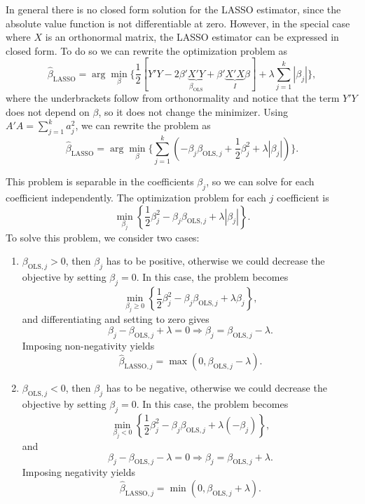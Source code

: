 \documentclass[11pt]{article}
\begin{document}
In general there is no closed form solution for the LASSO estimator, since the absolute value function is not differentiable at zero. However, in the special case where $X$ is an orthonormal matrix, the LASSO estimator can be expressed in closed form.
To do so we can rewrite the optimization problem as
\[
\hat{\beta}_{\text{LASSO}} 
= \arg\min_{\beta} 
\Big\{ \frac{1}{2}\left[Y'Y - 2\beta'\underbrace{X'Y}_{\beta_{\text{OLS}}} 
+ \beta'\underbrace{X'X}_{I}\beta\right]
+ \lambda \sum_{j=1}^{k} |\beta_j| \Big\},
\]
where the underbrackets follow from orthonormality and notice that the term $Y'Y$ does not depend on $\beta$, so it does not change the minimizer.
Using $A'A = \sum_{j=1}^{k} a_j^2$, we can rewrite the problem as
\[
\hat{\beta}_{\text{LASSO}} = \arg\min_{\beta} \Big\{ \sum_{j=1}^{k} \left( -\beta_j \beta_{\text{OLS},j} + \frac{1}{2}\beta_j^2 + \lambda |\beta_j| \right) \Big\}.
\]

This problem is separable in the coefficients $\beta_j$, so we can solve for each coefficient independently. The optimization problem for each $j$ coefficient is
\[\min_{\beta_j} \left\{\frac{1}{2} \beta_j^2 - \beta_j \beta_{\text{OLS},j} + \lambda |\beta_j| \right\}.\]
To solve this problem, we consider two cases:
\begin{enumerate}
    \item $\beta_{\text{OLS},j} > 0$, then $\beta_j$ has to be positive, otherwise we could decrease the objective by setting $\beta_j = 0$. 
    In this case, the problem becomes 
    \[\min_{\beta_j \geq 0} \left\{ \frac{1}{2} \beta_j^2 - \beta_j \beta_{\text{OLS},j} + \lambda \beta_j \right\},\]
    and differentiating and setting to zero gives
    \[\beta_j - \beta_{\text{OLS},j} + \lambda = 0 \Rightarrow \beta_j = \beta_{\text{OLS},j} - \lambda.\]
    Imposing non-negativity yields
    \[\hat{\beta}_{\text{LASSO},j} = \max\left(0, \beta_{\text{OLS},j} - \lambda\right).\]
    \item $\beta_{\text{OLS},j} < 0$, then $\beta_j$ has to be negative, otherwise we could decrease the objective by setting $\beta_j = 0$. In this case, the problem becomes
    \[\min_{\beta_j < 0} \left\{ \frac{1}{2} \beta_j^2 - \beta_j \beta_{\text{OLS},j} + \lambda (-\beta_j) \right\},\]    
    and
    \[\beta_j - \beta_{\text{OLS},j} - \lambda = 0 \Rightarrow \beta_j = \beta_{\text{OLS},j} + \lambda.\]
    Imposing negativity yields
    \[\hat{\beta}_{\text{LASSO},j} = \min\left(0, \beta_{\text{OLS},j} + \lambda\right).\]
\end{enumerate}
\end{document}
